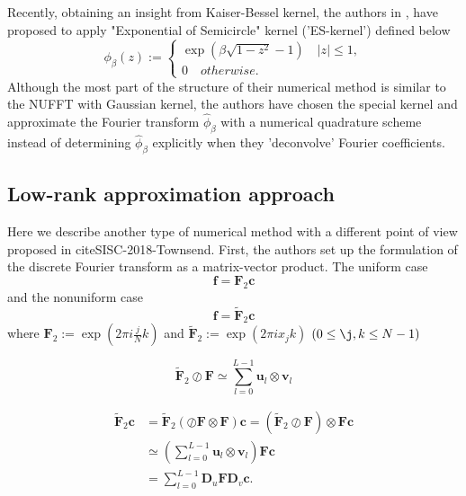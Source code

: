 Recently, obtaining an insight from Kaiser-Bessel kernel, the authors in \cite{SISC-2019-Barnett}, \cite{IEEE-2021-Barnett} have proposed to apply "Exponential of Semicircle" kernel ('ES-kernel') defined below
\begin{equation}
  \phi_{\beta}(z) :=
  \begin{cases}
    \exp\left(\beta\sqrt{1-z^2} - 1\right) \quad |z| \le 1,\\
    0 \quad otherwise.
  \end{cases}
  \label{eq:ES-kernel}
\end{equation}
Although the most part of the structure of their numerical method is similar to the NUFFT with Gaussian kernel, the authors have chosen the special kernel and approximate the Fourier transform $\hat{\phi}_{\beta}$ with a numerical quadrature scheme instead of determining $\hat{\phi}_{\beta}$ explicitly when they 'deconvolve' Fourier coefficients.

\subsection{Low-rank approximation approach}
Here we describe another type of numerical method with a different point of view proposed in cite{SISC-2018-Townsend}.
First, the authors set up the formulation of the discrete Fourier transform as a matrix-vector product.
The uniform case
\begin{equation}
  \bm{f} = \bm{F}_{2}\bm{c}
  \label{eq:matrix-vector-product-ufft-type-2}
\end{equation}
and the nonuniform case
\begin{equation}
  \bm{f} = \tilde{\bm{F}}_{2}\bm{c}
  \label{eq:matrix-vector-product-nufft-type-2}
\end{equation}
where
$\bm{F}_{2} := \exp(2\pi i \frac{j}{N}k)$ and
$\tilde{\bm{F}}_{2} := \exp(2\pi i x_{j}k)$
$(0 \le \j, k \le N-1)$

\begin{equation}
  \tilde{\bm{F}}_{2}\oslash\bm{F} \simeq
  \sum_{l=0}^{L-1}\bm{u}_{l}\otimes\bm{v}_{l}
\end{equation}

\begin{align}
     \tilde{\bm{F}}_{2}\bm{c}
  &= \tilde{\bm{F}}_{2}\left(\oslash\bm{F}\otimes\bm{F}\right)\bm{c}
   = \left(\tilde{\bm{F}}_{2}\oslash\bm{F}\right)\otimes\bm{F}\bm{c} \\
  &\simeq \left(\sum_{l=0}^{L-1}\bm{u}_{l}\otimes\bm{v}_{l}\right)\bm{F}\bm{c} \\
  &= \sum_{l=0}^{L-1} \bm{D}_{u}\bm{F}\bm{D}_{v}\bm{c}.
\end{align}


